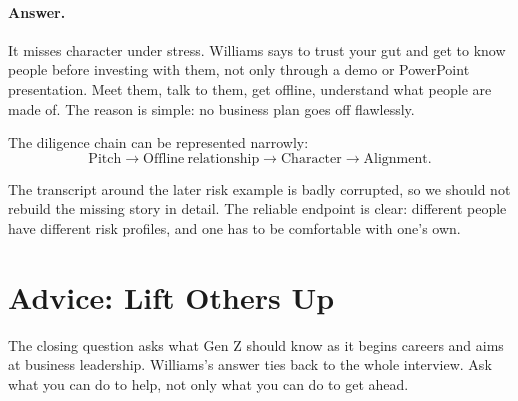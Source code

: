 \paragraph{Answer.} It misses character under stress. Williams says to trust your gut and get to know people before investing with them, not only through a demo or PowerPoint presentation. Meet them, talk to them, get offline, understand what people are made of. The reason is simple: no business plan goes off flawlessly.

The diligence chain can be represented narrowly:
\begin{equation}
\mathrm{Pitch}
\longrightarrow
\mathrm{Offline\ relationship}
\longrightarrow
\mathrm{Character}
\longrightarrow
\mathrm{Alignment}.
\end{equation}

\begin{figure}
\centering
{}
\end{figure}

The transcript around the later risk example is badly corrupted, so we should not rebuild the missing story in detail. The reliable endpoint is clear: different people have different risk profiles, and one has to be comfortable with one's own.

\section{Advice: Lift Others Up}

The closing question asks what Gen Z should know as it begins careers and aims at business leadership. Williams's answer ties back to the whole interview. Ask what you can do to help, not only what you can do to get ahead.

